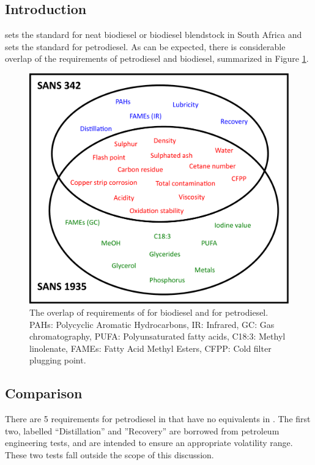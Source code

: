 \subsection{Introduction}
\label{sec:Comparison}

 sets the standard for neat biodiesel or biodiesel blendstock in
South Africa and  sets the standard for petrodiesel. As can be
expected, there is considerable overlap of the requirements of petrodiesel and
biodiesel, summarized in Figure \ref{fig:Venn}.

\begin{figure}
\centering
\includegraphics[width=\textwidth]{Figures/Venn.pdf}
\decoRule

\caption[Overlap of requirements ]{The overlap of requirements of  for biodiesel and  for petrodiesel. PAHs: Polycyclic
Aromatic Hydrocarbons, IR: Infrared, GC: Gas chromatography, PUFA:
Polyunsaturated fatty acids, C18:3: Methyl linolenate, FAMEs: Fatty
Acid Methyl Esters, CFPP: Cold filter plugging point.}

\label{fig:Venn}
\end{figure}

\subsection{Comparison}
There are \num{5} requirements for petrodiesel in  that have no
equivalents in . The first two, labelled ``Distillation'' and
''Recovery'' are borrowed from petroleum engineering tests, and are intended to
ensure an appropriate volatility range. These two tests fall outside the scope
of this discussion.

